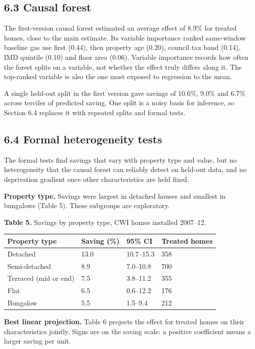 \documentclass[11pt,a4paper]{article}
\begin{document}
\subsection*{6.3 Causal forest}

The first-version causal forest estimated an average effect of 8.9\% for treated homes, close to the main estimate. Its variable importance ranked same-window baseline gas use first (0.44), then property age (0.20), council tax band (0.14), IMD quintile (0.10) and floor area (0.06). Variable importance records how often the forest splits on a variable, not whether the effect truly differs along it. The top-ranked variable is also the one most exposed to regression to the mean.

A single held-out split in the first version gave savings of 10.6\%, 9.0\% and 6.7\% across terciles of predicted saving. One split is a noisy basis for inference, so Section 6.4 replaces it with repeated splits and formal tests.

\subsection*{6.4 Formal heterogeneity tests}

The formal tests find savings that vary with property type and value, but no heterogeneity that the causal forest can reliably detect on held-out data, and no deprivation gradient once other characteristics are held fixed.

\textbf{Property type.} Savings were largest in detached houses and smallest in bungalows (Table 5). These subgroups are exploratory.

\textbf{Table 5.} Savings by property type, CWI homes installed 2007--12.

{\small
\begin{longtable}[]{@{}llll@{}}
\toprule\noalign{}
Property type & Saving (\%) & 95\% CI & Treated homes \\
\midrule\noalign{}
\endhead
\bottomrule\noalign{}
\endlastfoot
Detached & 13.0 & 10.7--15.3 & 358 \\
Semi-detached & 8.9 & 7.0--10.8 & 700 \\
Terraced (mid or end) & 7.5 & 3.8--11.2 & 355 \\
Flat & 6.5 & 0.6--12.2 & 176 \\
Bungalow & 5.5 & 1.5--9.4 & 212 \\
\end{longtable}
}

\textbf{Best linear projection.} Table 6 projects the effect for treated homes on their characteristics jointly. Signs are on the saving scale: a positive coefficient means a larger saving per unit.
\end{document}
